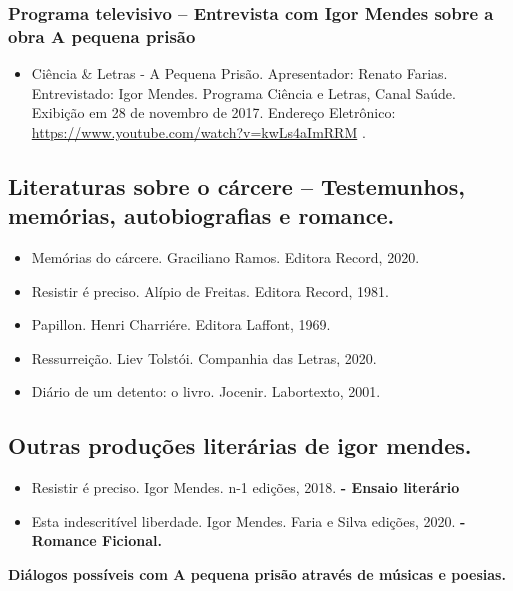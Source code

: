 \documentclass[11pt]{extarticle}
\begin{document}
\subsubsection{{Programa televisivo} -- Entrevista com Igor Mendes sobre a obra
A pequena prisão}

\begin{itemize}
\item
  Ciência \& Letras - A Pequena Prisão. Apresentador: Renato Farias.
  Entrevistado: Igor Mendes. Programa Ciência e Letras, Canal Saúde.
  Exibição em 28 de novembro de 2017. Endereço Eletrônico:
  \href{youtube.com/kwLs4aImRRM}{{https://www.youtube.com/watch?v=kwLs4aImRRM}}
  .
\end{itemize}

\subsection{{Literaturas sobre o cárcere} -- Testemunhos, memórias,
autobiografias e romance.}

\begin{itemize}
\item
  Memórias do cárcere. Graciliano Ramos. Editora Record, 2020.
\item
  Resistir é preciso. Alípio de Freitas. Editora Record, 1981.
\item
  Papillon. Henri Charriére. Editora Laffont, 1969.
\item
  Ressurreição. Liev Tolstói. Companhia das Letras, 2020.
\item
  Diário de um detento: o livro. Jocenir. Labortexto, 2001.
\end{itemize}

\subsection{{Outras produções literárias de igor mendes.}}

\begin{itemize}
\item
  Resistir é preciso. Igor Mendes. n-1 edições, 2018. \textbf{- Ensaio
  literário}
\item
  Esta indescritível liberdade. Igor Mendes. Faria e Silva edições,
  2020. \textbf{- Romance Ficional.}
\end{itemize}

\textbf{{Diálogos possíveis com A pequena prisão através de músicas e
poesias.}}
\end{document}
